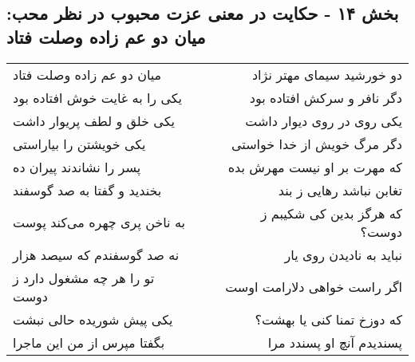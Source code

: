 \begin{center}
\section*{بخش ۱۴ - حکایت در معنی عزت محبوب در نظر محب: میان دو عم زاده وصلت فتاد}
\label{sec:014}
\begin{longtable}{l p{0.5cm} r}
میان دو عم زاده وصلت فتاد
&&
دو خورشید سیمای مهتر نژاد
\\
یکی را به غایت خوش افتاده بود
&&
دگر نافر و سرکش افتاده بود
\\
یکی خلق و لطف پریوار داشت
&&
یکی روی در روی دیوار داشت
\\
یکی خویشتن را بیاراستی
&&
دگر مرگ خویش از خدا خواستی
\\
پسر را نشاندند پیران ده
&&
که مهرت بر او نیست مهرش بده
\\
بخندید و گفتا به صد گوسفند
&&
تغابن نباشد رهایی ز بند
\\
به ناخن پری چهره می‌کند پوست
&&
که هرگز بدین کی شکیبم ز دوست؟
\\
نه صد گوسفندم که سیصد هزار
&&
نباید به نادیدن روی یار
\\
تو را هر چه مشغول دارد ز دوست
&&
اگر راست خواهی دلارامت اوست
\\
یکی پیش شوریده حالی نبشت
&&
که دوزخ تمنا کنی یا بهشت؟
\\
بگفتا مپرس از من این ماجرا
&&
پسندیدم آنچ او پسندد مرا
\\
\end{longtable}
\end{center}

